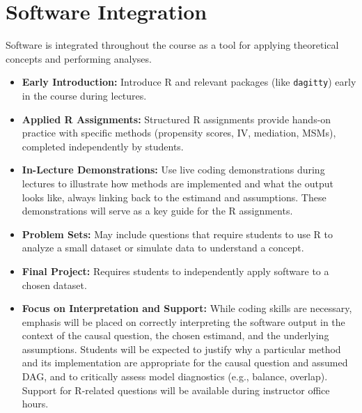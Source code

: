 \documentclass[10.5pt]{article}
\begin{document}
\section{Software Integration}
Software is integrated throughout the course as a tool for applying theoretical concepts and performing analyses.
\begin{itemize}
    \item \textbf{Early Introduction:} Introduce R and relevant packages (like \texttt{dagitty}) early in the course during lectures.
    \item \textbf{Applied R Assignments:} Structured R assignments provide hands-on practice with specific methods (propensity scores, IV, mediation, MSMs), completed independently by students.
    \item \textbf{In-Lecture Demonstrations:} Use live coding demonstrations during lectures to illustrate how methods are implemented and what the output looks like, always linking back to the estimand and assumptions. These demonstrations will serve as a key guide for the R assignments.
    \item \textbf{Problem Sets:} May include questions that require students to use R to analyze a small dataset or simulate data to understand a concept.
    \item \textbf{Final Project:} Requires students to independently apply software to a chosen dataset.
    \item \textbf{Focus on Interpretation and Support:} While coding skills are necessary, emphasis will be placed on correctly interpreting the software output in the context of the causal question, the chosen estimand, and the underlying assumptions. Students will be expected to justify why a particular method and its implementation are appropriate for the causal question and assumed DAG, and to critically assess model diagnostics (e.g., balance, overlap). Support for R-related questions will be available during instructor office hours.
\end{itemize}
%
%
\end{document}
